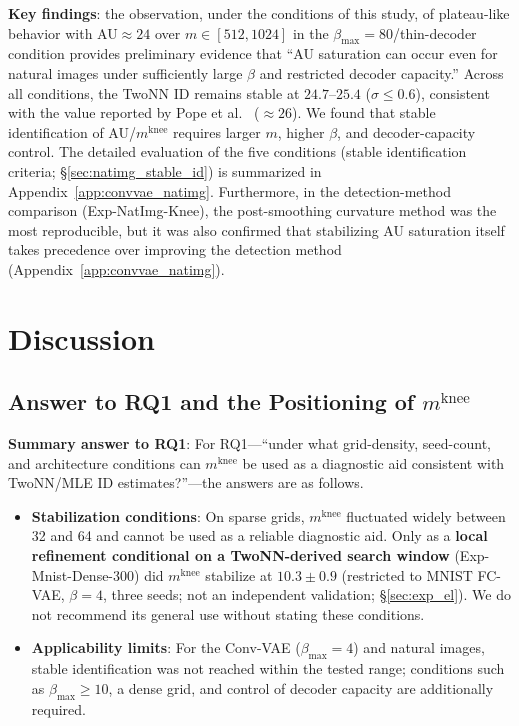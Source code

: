 \documentclass[make,article,submit,pdftex,moreauthors]{Definitions/mdpi}
\newcommand{\mknee}{m^{\mathrm{knee}}}
\begin{document}
\textbf{Key findings}:
the observation, under the conditions of this study, of plateau-like behavior
with AU$\approx 24$ over $m \in [512, 1024]$ in the
$\beta_{\max}=80$/thin-decoder condition provides preliminary evidence that
``AU saturation can occur even for natural images under sufficiently large
$\beta$ and restricted decoder capacity.''
Across all conditions, the TwoNN ID remains stable at $24.7$--$25.4$
($\sigma \leq 0.6$), consistent with the value reported by Pope et
al.~\cite{pope2021intrinsic} ($\approx 26$).
We found that stable identification of AU/$\mknee$ requires larger $m$, higher
$\beta$, and decoder-capacity control. The detailed evaluation of the five
conditions (stable identification criteria; \S\ref{sec:natimg_stable_id}) is
summarized in Appendix~\ref{app:convvae_natimg}.
Furthermore, in the detection-method comparison (Exp-NatImg-Knee), the
post-smoothing curvature method was the most reproducible, but it was also
confirmed that stabilizing AU saturation itself takes precedence over
improving the detection method (Appendix~\ref{app:convvae_natimg}).

\section{Discussion}\label{sec:discussion}

\subsection{Answer to RQ1 and the Positioning of $\mknee$}\label{sec:disc_mknee}

\textbf{Summary answer to RQ1}: For RQ1---``under what grid-density, seed-count,
and architecture conditions can $\mknee$ be used as a diagnostic aid consistent
with TwoNN/MLE ID estimates?''---the answers are as follows.

\begin{itemize}
  \item \textbf{Stabilization conditions}: On sparse grids, $\mknee$ fluctuated widely
        between 32 and 64 and cannot be used as a reliable diagnostic aid.
        Only as a \textbf{local refinement conditional on a TwoNN-derived search
        window} (Exp-Mnist-Dense-300) did $\mknee$ stabilize at $10.3 \pm 0.9$
        (restricted to MNIST FC-VAE, $\beta = 4$, three seeds; not an independent
        validation; \S\ref{sec:exp_el}).
        We do not recommend its general use without stating these conditions.
  \item \textbf{Applicability limits}: For the Conv-VAE ($\beta_{\max}=4$) and natural
        images, stable identification was not reached within the tested range;
        conditions such as $\beta_{\max} \geq 10$, a dense grid, and control of decoder
        capacity are additionally required.
\end{itemize}
\end{document}
